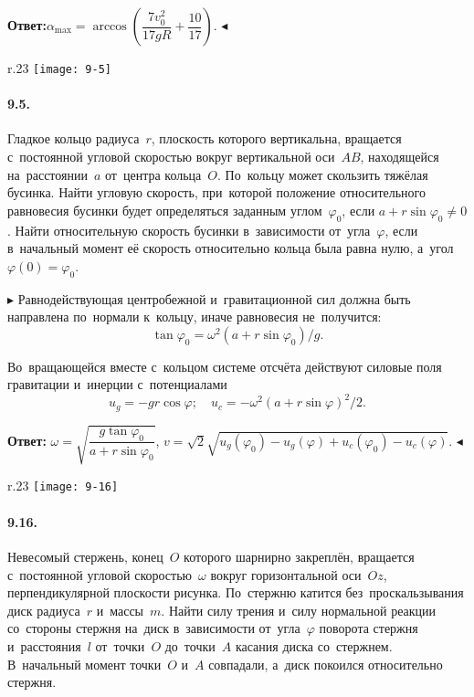 \documentclass{weekly}
\begin{document}
\medskip
\textbf{Ответ:}\qquad $\alpha_{\max} =
\arccos \left( \dfrac{7v_0^2}{17gR} + \dfrac{10}{17} \right)$.
\hfill $\blacktriangleleft$


\begin{wrapfigure}{r}{.23\textwidth}\vspace{-5mm}
\texttt{[image: 9-5]}
\end{wrapfigure}
\paragraph{9.5.} Гладкое кольцо радиуса~$r$, плоскость которого
вертикальна, вращается с~постоянной угловой скоростью вокруг
вертикальной оси~$AB$, находящейся на~расстоянии~$a$
от~центра кольца~$O$. По~кольцу может скользить тяжёлая бусинка.
Найти угловую скорость, при~которой положение относительного
равновесия бусинки будет определяться заданным углом~$\varphi_0$,
если $a + r\sin\varphi_0 \neq 0$. Найти относительную скорость
бусинки в~зависимости от~угла~$\varphi$, если в~начальный момент
её скорость относительно кольца была равна нулю,
а~угол~$\varphi(0) = \varphi_0$.

$\blacktriangleright$ Равнодействующая центробежной и~гравитационной
сил должна быть направлена по~нормали к~кольцу, иначе равновесия
не~получится:
\begin{equation}
    \tan\varphi_0 = \omega^2(a + r\sin\varphi_0)/g.
\end{equation}

Во~вращающейся вместе с~кольцом системе отсчёта действуют
силовые поля гравитации и~инерции с~потенциалами
\begin{equation}
    u_g = -gr\cos\varphi; \quad
    u_c = -\omega^2 (a + r\sin\varphi)^2/2.
\end{equation}

\textbf{Ответ:}\qquad
$\omega = \sqrt{\dfrac{g \tan\varphi_0}{a + r\sin\varphi_0}}$,
\quad
$v = \sqrt{2} \sqrt{u_g(\varphi_0) - u_g(\varphi)
    + u_c(\varphi_0) - u_c(\varphi)}$.
\hfill $\blacktriangleleft$


\begin{wrapfigure}{r}{.23\textwidth}
\texttt{[image: 9-16]}
\end{wrapfigure}
\paragraph{9.16.} Невесомый стержень, конец~$O$ которого
шарнирно закреплён, вращается с~постоянной угловой скоростью~$\omega$
вокруг горизонтальной оси~$Oz$, перпендикулярной плоскости рисунка.
По~стержню катится без~проскальзывания диск радиуса~$r$ и~массы~$m$.
Найти силу трения и~силу нормальной реакции со~стороны стержня
на~диск в~зависимости от~угла~$\varphi$ поворота стержня
и~расстояния~$l$ от~точки~$O$ до~точки~$A$ касания диска со~стержнем.
В~начальный момент точки~$O$ и~$A$ совпадали, а~диск покоился
относительно стержня.
\end{document}
